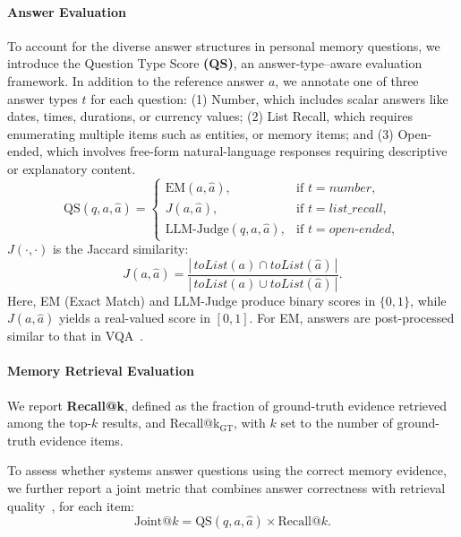 \documentclass{article}
\theoremstyle{plain}
\theoremstyle{definition}
\theoremstyle{remark}
\begin{document}
\paragraph{Answer Evaluation}
To account for the diverse answer structures in personal memory questions, we introduce the Question Type Score \textbf{ (QS)}, an answer-type–aware evaluation framework. In addition to the reference answer $a$, we annotate one of three answer types $t$ for each question: (1) Number, which includes scalar answers like dates, times, durations, or currency values; (2) List Recall, which requires enumerating multiple items such as entities, or memory items; and (3) Open-ended, which involves free-form natural-language responses requiring descriptive or explanatory content.
\begin{equation}
\text{QS}(q,a,\hat{a}) =
\begin{cases}
\text{EM}(a, \hat{a}), & \text{if } t = \textit{number}, \\
J(a, \hat{a}), & \text{if } t = \textit{list\_recall}, \\
\text{LLM-Judge}(q, a, \hat{a}),&  \text{if } t = \textit{open-ended},
\end{cases}
\end{equation}
$J(\cdot,\cdot)$ is the Jaccard similarity:
\begin{equation}
J(a, \hat{a}) = \frac{|\, \textit{toList}(a) \cap \textit{toList}(\hat{a})\,|}{|\,\textit{toList}(a) \cup \textit{toList}(\hat{a})\,|}.
\end{equation}
Here, EM (Exact Match) and LLM-Judge produce binary scores in $\{0,1\}$, while $J(a,\hat{a})$ yields a real-valued score in $[0,1]$.
For EM, answers are post-processed similar to that in VQA~\citep{Mensink2023EVQA, Chen2023infoseek}. %
\paragraph{Memory Retrieval Evaluation}
\label{sec:retrieval_metrics}

We report \textbf{Recall@k}, defined as the fraction of ground-truth evidence retrieved among the top-$k$ results, and Recall@k$_{\textrm{GT}}$, with $k$ set to the number of ground-truth evidence items.

To assess whether systems answer questions using the correct memory evidence, we further report a joint metric that combines answer correctness with retrieval quality~\citep{hotpotqa}, for each item:
\begin{equation}
\text{Joint@}k = \text{QS}(q, a, \hat{a}) \times \text{Recall@}k.
\end{equation}
\end{document}
